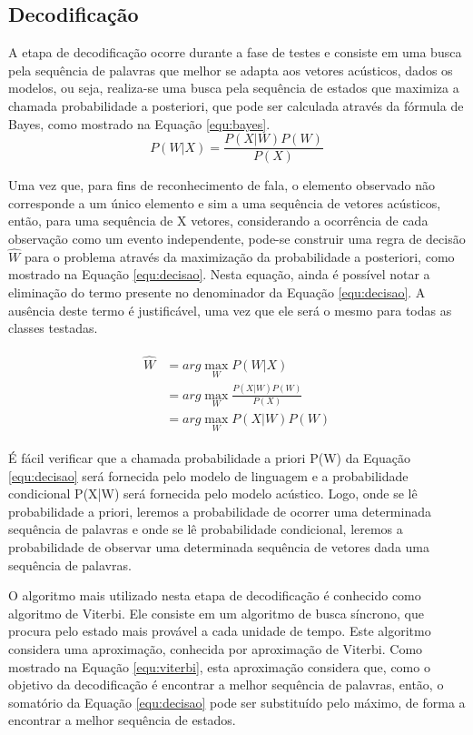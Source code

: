 \documentclass[12pt,a4paper,oneside]{report}
\begin{document}
\subsection{Decodificação}

A etapa de decodificação ocorre durante a fase de testes e consiste em uma busca pela sequência de palavras que melhor se adapta aos vetores acústicos, dados os modelos, ou seja, realiza-se uma busca pela sequência de estados que maximiza a chamada probabilidade a posteriori, que pode ser calculada através da fórmula de Bayes, como mostrado na Equação \ref{equ:bayes}.
\begin{equation}
P(W|X) = \frac{P(X|W)P(W)}{P(X)}
\label{equ:bayes}
\end{equation}

Uma vez que, para fins de reconhecimento de fala, o elemento observado não corresponde a um único elemento e sim a uma sequência de vetores acústicos, então, para uma sequência de X vetores, considerando a ocorrência de cada observação como um evento independente, pode-se construir uma regra de decisão $\widehat{W}$ para o problema através da maximização da probabilidade a posteriori, como mostrado na Equação \ref{equ:decisao}. Nesta equação, ainda é possível notar a eliminação do termo presente no denominador da Equação \ref{equ:decisao}. A ausência deste termo é justificável, uma vez que ele será o mesmo para todas as classes testadas.

\begin{align}
\begin{split}
\widehat{W} &= arg \max _{W} P(W|X) \\
&= arg \max _{W} \frac{P(X|W)P(W)}{P(X)} \\
&= arg \max _{W} P(X|W)P(W)
\end{split}
\label{equ:decisao}
\end{align}

É fácil verificar que a chamada probabilidade a priori P(W) da Equação \ref{equ:decisao} será fornecida pelo modelo de linguagem e a probabilidade condicional P(X|W) será fornecida pelo modelo acústico. Logo, onde se lê probabilidade a priori, leremos a probabilidade de ocorrer uma determinada sequência de palavras e onde se lê probabilidade condicional, leremos a probabilidade de observar uma determinada sequência de vetores dada uma sequência de palavras.

O algoritmo mais utilizado nesta etapa de decodificação é conhecido como algoritmo de Viterbi. Ele consiste em um algoritmo de busca síncrono, que procura pelo estado mais provável a cada unidade de tempo. Este algoritmo considera uma aproximação, conhecida por aproximação de Viterbi. Como mostrado na Equação \ref{equ:viterbi}, esta aproximação considera que, como o objetivo da decodificação é encontrar a melhor sequência de palavras, então, o somatório da
Equação \ref{equ:decisao} pode ser substituído pelo máximo, de forma a encontrar a melhor sequência de estados.
\end{document}
